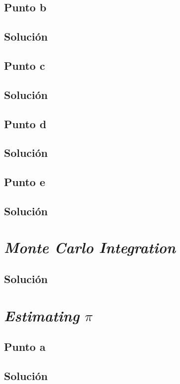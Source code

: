 \documentclass[12pt]{article}
\begin{document}
\subsection{Punto b}
\subsection{Solución}

\subsection{Punto c}
\subsection{Solución}

\subsection{Punto d}
\subsection{Solución}

\subsection{Punto e}
\subsection{Solución}


\section{\textit{Monte Carlo Integration}}
\subsection{Solución}

\section{\textit{Estimating} \(\pi\)}

\subsection{Punto a}
\subsection{Solución}
\end{document}
